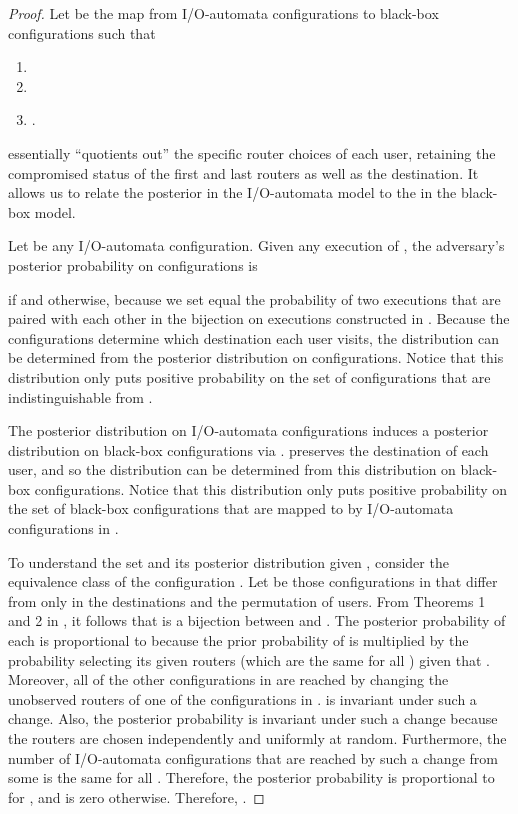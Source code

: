 \documentclass[prodmode,acmtissec]{acmsmall}
\begin{document}
\begin{proof}
Let  be the map from I/O-automata configurations to black-box configurations such that
\begin{enumerate}
\item 
\item 
\item .
\end{enumerate}
 essentially ``quotients out''  the specific router choices of each user, retaining the compromised status of the first and last routers as well as the destination.   It allows us to relate the posterior  in the I/O-automata model to the  in the black-box model.

Let  be any I/O-automata configuration.  Given any execution  of , the adversary's posterior probability on configurations is

if  and  otherwise, because we set equal the probability of two executions that are paired with each other in the bijection on executions constructed in .  Because the configurations determine which destination each user visits, the distribution  can be determined from the posterior distribution on configurations.  Notice that this distribution only puts positive probability on the set  of configurations that are indistinguishable from .

The posterior distribution on I/O-automata configurations induces a posterior distribution on black-box configurations via .   preserves the destination of each user, and so the distribution  can be determined from this distribution on black-box configurations.  Notice that this distribution only puts positive probability on the set of black-box configurations  that are mapped to by I/O-automata configurations in .

To understand the set  and its posterior distribution given , consider the equivalence class  of the configuration .  Let  be those configurations in  that differ from  only in the destinations and the permutation of users.   From Theorems 1 and 2 in , it follows that  is a bijection between  and .  The posterior probability of each  is proportional to  because the prior probability of  is  multiplied by the probability selecting its given routers (which are the same for all ) given that .  Moreover, all of the other configurations in  are reached by changing the unobserved routers of one of the configurations in .   is invariant under such a change.  Also, the posterior probability is invariant under such a change because the routers are chosen independently and uniformly at random.  Furthermore, the number of I/O-automata configurations that are reached by such a change from some  is the same for all .  Therefore, the posterior probability  is proportional to  for , and is zero otherwise.  Therefore, .


\end{proof}
\end{document}
